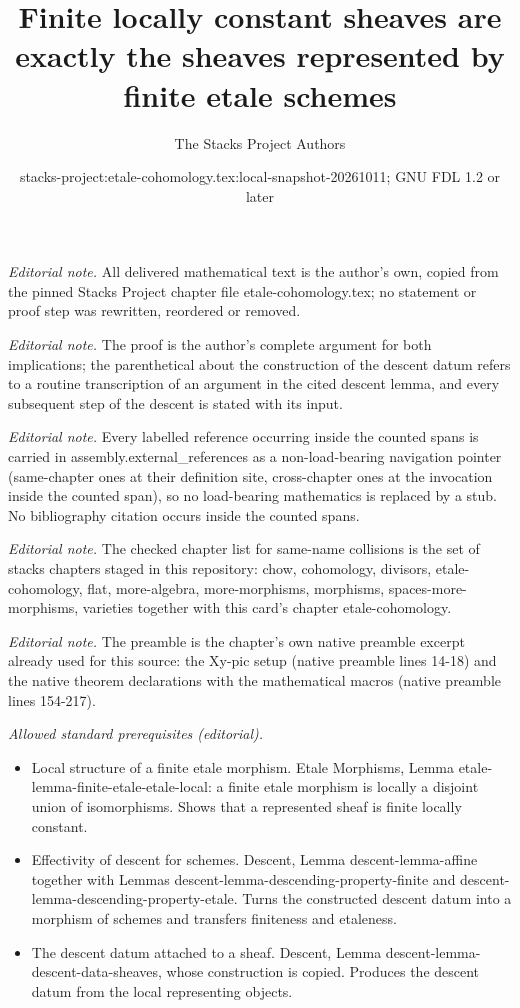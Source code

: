 \documentclass[10pt,a4paper]{amsart}
\title{Finite locally constant sheaves are exactly the sheaves represented by finite etale schemes}
\author{The Stacks Project Authors}
\date{stacks-project:etale-cohomology.tex:local-snapshot-20261011; GNU FDL 1.2 or later}
\theoremstyle{plain}
\theoremstyle{definition}
\theoremstyle{remark}
\numberwithin{equation}{subsection}
\begin{document}
\maketitle
\noindent\textit{Editorial note.} All delivered mathematical text is the author's own, copied from the pinned Stacks Project chapter file etale-cohomology.tex; no statement or proof step was rewritten, reordered or removed.\par\medskip
\noindent\textit{Editorial note.} The proof is the author's complete argument for both implications; the parenthetical about the construction of the descent datum refers to a routine transcription of an argument in the cited descent lemma, and every subsequent step of the descent is stated with its input.\par\medskip
\noindent\textit{Editorial note.} Every labelled reference occurring inside the counted spans is carried in assembly.external\_references as a non-load-bearing navigation pointer (same-chapter ones at their definition site, cross-chapter ones at the invocation inside the counted span), so no load-bearing mathematics is replaced by a stub. No bibliography citation occurs inside the counted spans.\par\medskip
\noindent\textit{Editorial note.} The checked chapter list for same-name collisions is the set of stacks chapters staged in this repository: chow, cohomology, divisors, etale-cohomology, flat, more-algebra, more-morphisms, morphisms, spaces-more-morphisms, varieties together with this card's chapter etale-cohomology.\par\medskip
\noindent\textit{Editorial note.} The preamble is the chapter's own native preamble excerpt already used for this source: the Xy-pic setup (native preamble lines 14-18) and the native theorem declarations with the mathematical macros (native preamble lines 154-217).\par\medskip
\noindent\textit{Allowed standard prerequisites (editorial).}\begin{itemize}
\item Local structure of a finite etale morphism. Etale Morphisms, Lemma etale-lemma-finite-etale-etale-local: a finite etale morphism is locally a disjoint union of isomorphisms. Shows that a represented sheaf is finite locally constant.
\item Effectivity of descent for schemes. Descent, Lemma descent-lemma-affine together with Lemmas descent-lemma-descending-property-finite and descent-lemma-descending-property-etale. Turns the constructed descent datum into a morphism of schemes and transfers finiteness and etaleness.
\item The descent datum attached to a sheaf. Descent, Lemma descent-lemma-descent-data-sheaves, whose construction is copied. Produces the descent datum from the local representing objects.
\end{itemize}\medskip
\end{document}
